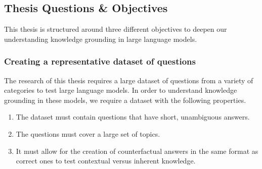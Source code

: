 \newpage{}

\subsection{Thesis Questions \& Objectives}

This thesis is structured around three different objectives to deepen our understanding knowledge grounding in large language models.


\subsubsection{Creating a representative dataset of questions}
\label{questions_objective}

The research of this thesis requires a large dataset of questions from a variety of categories to test large language models.
In order to understand knowledge grounding in these models, we require a dataset with the following properties.
\begin{enumerate}
	\item The dataset must contain questions that have short, unambiguous answers.
	\item The questions must cover a large set of topics.
	\item It must allow for the creation of counterfactual answers in the same format as correct ones to test contextual versus inherent knowledge.
\end{enumerate}

